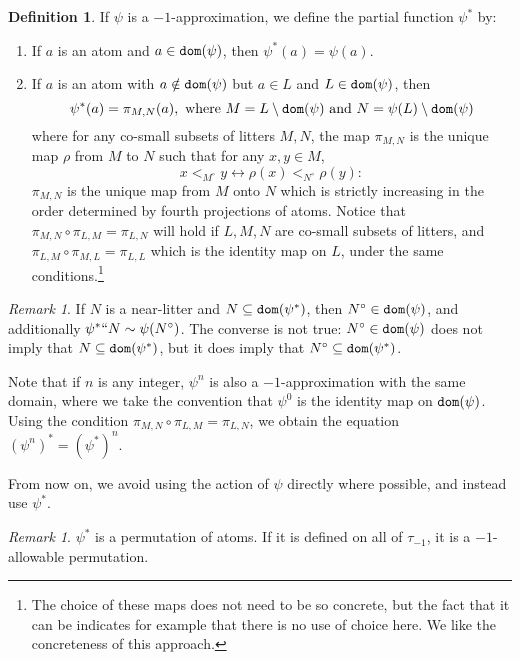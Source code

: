 \documentclass[112pt]{article}
\theoremstyle{definition}
\newtheorem{definition}[theorem]{Definition}
\theoremstyle{remark}
\newtheorem{remark}[theorem]{Remark}
\begin{document}
\begin{definition}
  If $\psi$ is a $-1$-approximation, we define the partial function $\psi^*$ by:
  \begin{enumerate}
    \item If $a$ is an atom and $a \in {\tt dom}(\psi)$, then $\psi^*(a) = \psi(a)$.
    \item If $a$ is an atom with $a \notin {\tt dom}(\psi)$ but $a \in L$ and $L \in {\tt dom}(\psi)$, then
    $$ \psi^*(a) = \pi_{M, N}(a),\ \mathrm{where}\ M = L \setminus {\tt dom}(\psi) \ \mathrm{and}\ N = \psi(L) \setminus {\tt dom}(\psi) $$
    where for any co-small subsets of litters $M, N$, the map $\pi_{M,N}$ is the unique map $\rho$ from $M$ to $N$ such that for any $x, y \in M$,
    $$x <_{M^{\circ}} y \leftrightarrow \rho(x) <_{N^\circ} \rho(y):$$
    $\pi_{M,N}$ is the unique map from $M$ onto $N$ which is strictly increasing in the order determined by fourth projections of atoms.  Notice that $ \pi_{M,N} \circ \pi_{L,M} = \pi_{L,N}$ will hold if $L,M,N$ are co-small subsets of litters, 
and $\pi_{L,M} \circ \pi_{M,L} = \pi_{L,L}$ which is the identity map on $L$, under the same conditions.\footnote{The choice of these maps does not need to be so concrete, but the fact that it can be indicates for example that there is no use of choice here.  We like the concreteness of this approach.}
  \end{enumerate}
\end{definition}
\begin{remark}
  If $N$ is a near-litter and $N \subseteq {\tt dom}(\psi^*)$, then $N^\circ \in {\tt dom}(\psi)$, and additionally $\psi^* `` N \sim \psi(N^\circ)$.
  The converse is not true: $N^\circ \in {\tt dom}(\psi)$ does not imply that $N \subseteq {\tt dom}(\psi^*)$, but it does imply that $N^\circ \subseteq {\tt dom}(\psi^*)$.

  Note that if $n$ is any integer, $\psi^n$ is also a $-1$-approximation with the same domain, where we take the convention that $\psi^0$ is the identity map on ${\tt dom}(\psi)$.
  Using the condition $\pi_{M,N} \circ \pi_{L,M} = \pi_{L,N}$, we obtain the equation $(\psi^n)^* = (\psi^*)^n$.
\end{remark}
From now on, we avoid using the action of $\psi$ directly where possible, and instead use $\psi^*$.
\begin{remark}\label{rk:minus_one_approx_allowable}
  $\psi^*$ is a permutation of atoms.
  If it is defined on all of $\tau_{-1}$, it is a $-1$-allowable permutation.
\end{remark}
\end{document}
